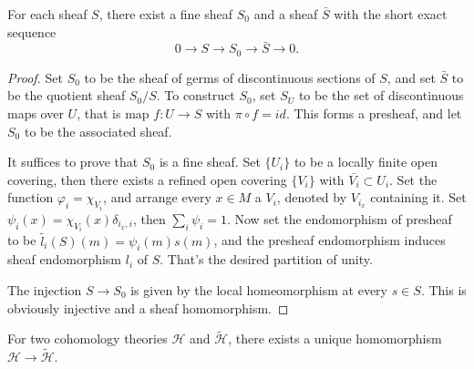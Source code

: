 \documentclass[twoside]{article}
\begin{document}
\begin{lemma}
  For each sheaf $S$, there exist a fine sheaf $S_0$ and a sheaf $\bar{S}$ with the short exact sequence$$
  0\to S\to S_0\to \bar{S}\to 0.
  $$
\end{lemma}
\begin{proof}
  Set $S_0$ to be  the sheaf of germs of discontinuous sections of $S$, and set $\bar{S}$ to  be the quotient sheaf $S_0/S$.  To construct $S_0$,   set  $S_U$ to be  the set of discontinuous maps over $U$, that is map $f:U\to S$ with $\pi\circ f=id$. This forms a presheaf, and let $S_0$ to be the associated sheaf.

  It suffices to prove that $S_0$ is a fine sheaf. Set $\{U_i\}$  to be a locally finite open covering, then there exists a refined open covering $\{V_i\}$ with $\bar{V_i}\subset U_i$. Set the function $\varphi_i=\chi_{V_i}$, and arrange every $x\in M$ a $V_i$, denoted by $V_{i_x}$  containing it. Set $\psi_i(x)=\chi_{V_i}(x)\delta_{i_x,i}$, then $\sum_i \psi_i=1$.  Now set the endomorphism of presheaf to be  $\tilde{l_i}(S)(m)=\psi_i(m)s(m)$, and the presheaf endomorphism induces sheaf endomorphism $l_i$ of $S$. That's the desired partition of unity.

  The injection $S\to S_0 $ is given by the local homeomorphism at every $s\in S$. This is obviously injective and a sheaf homomorphism.
\end{proof}




\begin{theorem}
  For two cohomology theories $\mathscr{H}$ and $\tilde{\mathscr{H}}$, there exists a unique homomorphism $\mathscr{H}\to \tilde{\mathscr{H}}$.
\end{theorem}
\end{document}
